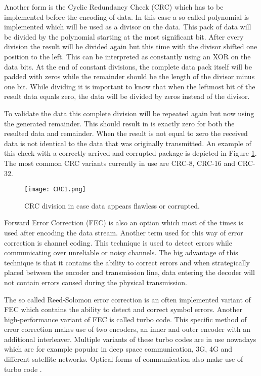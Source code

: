 Another form is the Cyclic Redundancy Check (CRC) which has to be implemented before the encoding of data. In this case a so called polynomial is implemented which will be used as a divisor on the data. This pack of data will be divided by the polynomial starting at the most significant bit. After every division the result will be divided again but this time with the divisor shifted one position to the left. This can be interpreted as constantly using an XOR on the data bits. At the end of constant divisions, the complete data pack itself will be padded with zeros while the remainder should be the length of the divisor minus one bit. While dividing it is important to know that when the leftmost bit of the result data equals zero, the data will be divided by zeros instead of the divisor.

To validate the data this complete division will be repeated again but now using the generated remainder. This should result in is exactly zero for both the resulted data and remainder. \cite{CRCLB} When the result is not equal to zero the received data is not identical to the data that was originally transmitted. An example of this check with a correctly arrived and corrupted package is depicted in Figure \ref{fig:CRC_Check}.\cite{CRC1} The most common CRC variants currently in use are CRC-8, CRC-16 and CRC-32. \\

\begin{figure}[ht]
	\centering
	\texttt{[image: CRC1.png]}	
	\caption{CRC division in case data appears flawless or corrupted.}
	\label{fig:CRC_Check}
\end{figure} 

\label{sec:FEC}
Forward Error Correction (FEC) is also an option which most of the times is used after encoding the data stream. Another term used for this way of error correction is channel coding. This technique is used to detect errors while communicating over unreliable or noisy channels. The big advantage of this technique is that it contains the ability to correct errors and when strategically placed between the encoder and transmission line, data entering the decoder will not contain errors caused during the physical transmission.

The so called Reed-Solomon error correction is an often implemented variant of FEC which contains the ability to detect and correct symbol errors. 
Another high-performance variant of FEC is called turbo code. This specific method of error correction makes use of two encoders, an inner and outer encoder with an additional interleaver. Multiple variants of these turbo codes are in use nowadays which are for example popular in deep space communication, 3G, 4G and different satellite networks. Optical forms of communication also make use of turbo code \cite{turbocode}.

